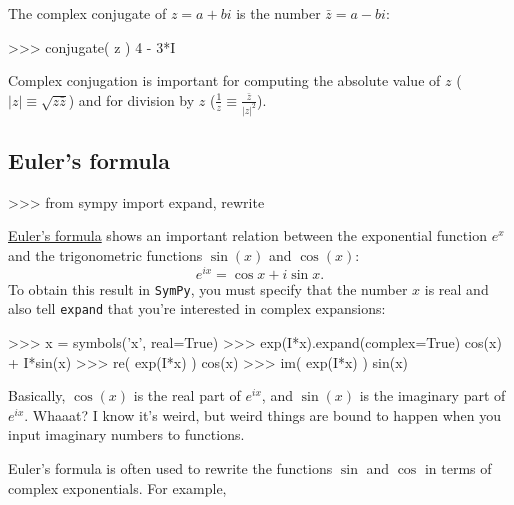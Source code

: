 \noindent
The complex conjugate of $z=a+bi$ is the number $\bar{z} = a-bi$:



\small
\begin{verbatimtab}
>>> conjugate( z )
4 - 3*I
\end{verbatimtab}
\normalsize

\noindent
Complex conjugation is important for computing the absolute value of $z$
($|z|\equiv\sqrt{ z\bar{z} }$) and for division by $z$ ($\frac{1}{z} \equiv \frac{\bar{z}}{|z|^2}$).

\subsection{Euler's formula}
\label{complex_numbers:euler_s_formula}

\small
\begin{verbatimtab}
>>> from sympy import expand, rewrite
\end{verbatimtab}
\normalsize
\href{https://en.wikipedia.org/wiki/Euler's_formula}{Euler's formula} shows an important relation 
between the exponential function $e^x$ and the trigonometric functions $\sin(x)$ and $\cos(x)$:  
\[
  e^{ix} = \cos x + i \sin x.
\]
To obtain this result in \texttt{SymPy}, you must specify that the number $x$ is real
and also tell \texttt{expand} that you're interested in complex expansions:

\small
\begin{verbatimtab}
>>> x = symbols('x', real=True)
>>> exp(I*x).expand(complex=True)
cos(x) + I*sin(x) 
>>> re( exp(I*x) ) 
cos(x)
>>> im( exp(I*x) ) 
sin(x)
\end{verbatimtab}
\normalsize

\noindent
Basically, $\cos(x)$ is the real part of $e^{ix}$,
and $\sin(x)$ is the imaginary part of $e^{ix}$.
Whaaat? 
I know it's weird,
but weird things are bound to happen when you input imaginary numbers to functions.


Euler's formula is often used to rewrite the functions $\sin$ and $\cos$ in terms of complex exponentials.
For example,

